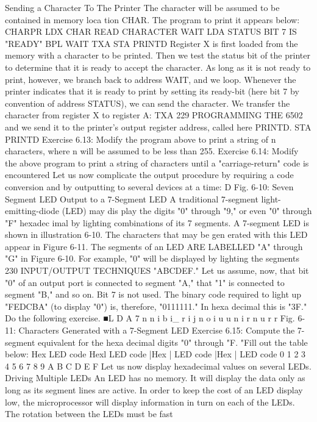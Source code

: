 Sending a Character To The Printer
The character will be assumed to be contained in memory loca
tion CHAR. The program to print it appears below:
CHARPR LDX CHAR READ CHARACTER
WAIT LDA STATUS BIT 7 IS "READY"
BPL WAIT
TXA
STA PRINTD
Register X is first loaded from the memory with a character to
be printed. Then we test the status bit of the printer to determine
that it is ready to accept the character. As long as it is not ready to
print, however, we branch back to address WAIT, and we loop.
Whenever the printer indicates that it is ready to print by setting
its ready-bit (here bit 7 by convention of address STATUS), we
can send the character. We transfer the character from register X
to register A:
TXA
229
PROGRAMMING THE 6502
and we send it to the printer's output register address, called here
PRINTD.
STA PRINTD
Exercise 6.13: Modify the program above to print a string of n
characters, where n will be assumed to be less than 255.
Exercise 6.14: Modify the above program to print a string of
characters until a "carriage-return" code is encountered
Let us now complicate the output procedure by requiring a code
conversion and by outputting to several devices at a time:
D
Fig. 6-10: Seven Segment LED
Output to a 7-Segment LED
A traditional 7-segment light-emitting-diode (LED) may dis
play the digits "0" through "9," or even "0" through "F" hexadec
imal by lighting combinations of its 7 segments. A 7-segment
LED is shown in illustration 6-10. The characters that may be gen
erated with this LED appear in Figure 6-11. The segments of an LED
ARE LABELLED "A" through "G" in Figure 6-10.
For example, "0" will be displayed by lighting the segments
230
INPUT/OUTPUT TECHNIQUES
"ABCDEF." Let us assume, now, that bit "0" of an output port is
connected to segment "A," that "1" is connected to segment "B,"
and so on. Bit 7 is not used. The binary code required to light up
"FEDCBA" (to display "0") is, therefore, "0111111." In hexa
decimal this is "3F." Do the following exercise.
■L
D
A
7
n
n
i
b
i_
r
i
j
n
o
i
u
u
n
i
r
n
u
r
r
Fig. 6-11: Characters Generated with a 7-Segment LED
Exercise 6.15: Compute the 7-segment equivalent for the hexa
decimal digits "0" through "F. "Fill out the table below:
Hex LED code Hexl LED code |Hex | LED code |Hex | LED code
0
1
2
3
4
5
6
7
8
9
A
B
C
D
E
F
Let us now display hexadecimal values on several LEDs.
Driving Multiple LEDs
An LED has no memory. It will display the data only as long as
its segment lines are active. In order to keep the cost of an LED
display low, the microprocessor will display information in turn
on each of the LEDs. The rotation between the LEDs must be fast
